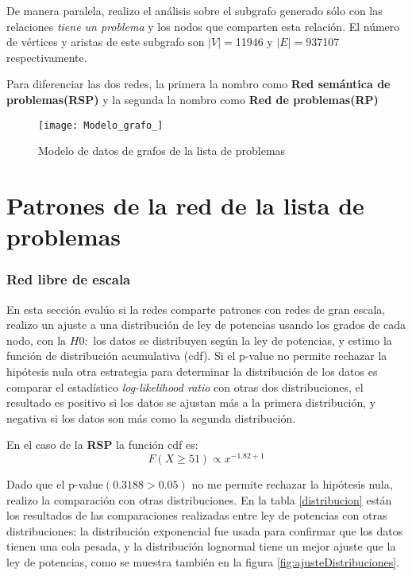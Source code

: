 De manera paralela, realizo el análisis sobre el subgrafo generado sólo con las relaciones \textit{tiene un problema} y los nodos que comparten esta relación. El número de vértices y aristas de este subgrafo son $|V|=$\num{11946} y $|E|=$\num{937107} respectivamente.

Para diferenciar las dos redes, la primera la nombro como \textbf{Red semántica de problemas(RSP)} y la segunda la nombro como \textbf{Red de problemas(RP)}

\begin{figure}[ht]
\caption{Modelo de datos de grafos de la lista de problemas}
\label{fig:ModeloGrafo}
\centering
\texttt{[image: Modelo\_grafo\_]}
\end{figure}

\section{Patrones de la red de la lista de problemas}
\subsubsection{Red libre de escala}
En esta sección evalúo si la redes comparte patrones con redes de gran escala, realizo un ajuste a una distribución de ley de potencias usando los grados de cada nodo, con la $H0:$ los datos se distribuyen según la ley de potencias, y estimo la función de distribución acumulativa (cdf). Si el p-value no permite rechazar la hipótesis nula otra estrategia para determinar la distribución de los datos es comparar el estadístico \textit{log-likelihood ratio} con otras dos distribuciones, el resultado es positivo si los datos se ajustan más a la primera distribución, y negativa si los datos son más como la segunda distribución.

En el caso de la \textbf{RSP} la función cdf es:
\begin{equation}
F(X\geq 51) \propto x^{-1.82 +1}
\end{equation}

Dado que el p-value$(0.3188>0.05)$ no me permite rechazar la hipótesis nula, realizo la comparación con otras distribuciones. En la tabla \ref{distribucion} están los resultados de las comparaciones realizadas entre ley de potencias con otras distribuciones: la distribución exponencial fue usada para confirmar que los datos tienen una cola pesada, y la distribución lognormal tiene un mejor ajuste que la ley de potencias, como se muestra también en la figura \ref{fig:ajusteDistribuciones}.

